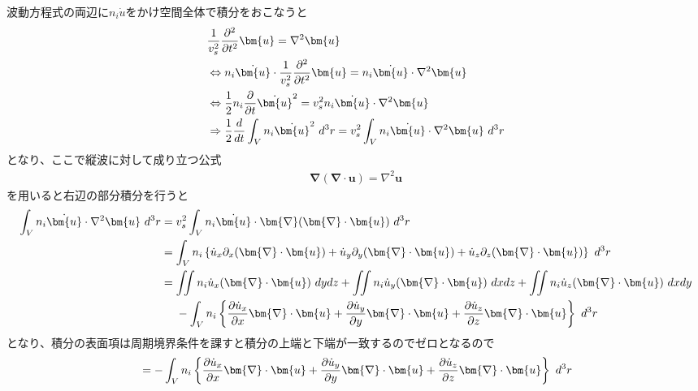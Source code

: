 \documentclass[dvipdfmx, 11pt, a4paper]{jsarticle}
\numberwithin{equation}{section}
\theoremstyle{definition}
\begin{document}
    \begin{derivationBox}
        波動方程式の両辺に$n_i \dot{u}$をかけ空間全体で積分をおこなうと
        \begin{align}
            &\frac{1}{v_s^2}\frac{\partial^2}{\partial t^2}\bm{u} = \nabla^2 \bm{u} \notag \\
            &\Leftrightarrow n_i \dot{\bm{u}} \cdot \frac{1}{v_s^2}\frac{\partial^2}{\partial t^2}\bm{u} = n_i \dot{\bm{u}} \cdot \nabla^2 \bm{u} \notag \\
            &\Leftrightarrow \frac{1}{2}n_i \frac{\partial}{\partial t}\dot{\bm{u}}^2 = v_s^2n_i\dot{\bm{u}} \cdot \nabla^2 \bm{u} \notag \\
            &\Rightarrow \frac{1}{2}\frac{d}{dt} \int_V n_i \dot{\bm{u}}^2\ d^3r = v_s^2 \int_V n_i\dot{\bm{u}} \cdot \nabla^2 \bm{u}\ d^3r
        \end{align}
        となり、ここで縦波に対して成り立つ公式
        \begin{align}
            \bm{\nabla}(\bm{\nabla}\cdot \bm{u}) = \nabla^2 \bm{u}
        \end{align}
        を用いると右辺の部分積分を行うと
        \begin{align}
            \int_V n_i\dot{\bm{u}} \cdot \nabla^2 \bm{u}\ d^3r &= v_s^2 \int_V n_i\dot{\bm{u}} \cdot \bm{\nabla}(\bm{\nabla}\cdot \bm{u})\ d^3r \notag \\
            &= \int_V n_i\left\{ \dot{u}_x \partial_x (\bm{\nabla}\cdot \bm{u}) + \dot{u}_y \partial_y (\bm{\nabla}\cdot \bm{u}) + \dot{u}_z \partial_z (\bm{\nabla}\cdot \bm{u}) \right\}\ d^3r \notag \\
            &= \iint n_i \dot{u}_x (\bm{\nabla}\cdot \bm{u})\ dydz + \iint n_i \dot{u}_y (\bm{\nabla}\cdot \bm{u})\ dxdz + \iint n_i \dot{u}_z (\bm{\nabla}\cdot \bm{u})\ dxdy \notag \\
            &\ \ \ \ -\int_V n_i\left\{ \frac{\partial \dot{u}_x}{\partial x} \bm{\nabla} \cdot \bm{u} + \frac{\partial \dot{u}_y}{\partial y} \bm{\nabla} \cdot \bm{u} + \frac{\partial \dot{u}_z}{\partial z} \bm{\nabla} \cdot \bm{u} \right\}\ d^3r
        \end{align}
        となり、積分の表面項は周期境界条件を課すと積分の上端と下端が一致するのでゼロとなるので
        \begin{align}
            &=  -\int_V n_i\left\{ \frac{\partial \dot{u}_x}{\partial x} \bm{\nabla} \cdot \bm{u} + \frac{\partial \dot{u}_y}{\partial y} \bm{\nabla} \cdot \bm{u} + \frac{\partial \dot{u}_z}{\partial z} \bm{\nabla} \cdot \bm{u} \right\}\ d^3r \notag \\

\end{align}
\end{derivationBox}
\end{document}
